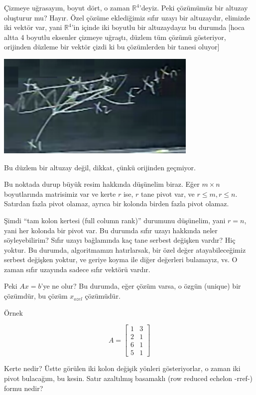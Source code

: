 \documentclass[12pt,fleqn]{article}\usepackage{../../common}
\begin{document}
Çizmeye uğrasayım, boyut dört, o zaman $\mathbb{R}^4$'deyiz. Peki çözümümüz
bir altuzay oluşturur mu? Hayır. Özel çözüme eklediğimiz sıfır uzayı bir
altuzaydır, elimizde iki vektör var, yani $\mathbb{R}^4$'in içinde iki
boyutlu bir altuzaydayız bu durumda [hoca altta 4 boyutlu eksenler çizmeye
uğraştı, düzlem tüm çözümü gösteriyor, orijinden düzleme bir vektör çizdi
ki bu çözümlerden bir tanesi oluyor]

\includegraphics[height=5cm]{8_01.png}

Bu düzlem bir altuzay değil, dikkat, çünkü orijinden geçmiyor. 

Bu noktada durup büyük resim hakkında düşünelim biraz. Eğer $m \times n$
boyutlarında matrisimiz var ve kerte $r$ ise, $r$ tane pivot var, ve 
$r \le m,r \le n$. Satırdan fazla pivot olamaz, ayrıca bir kolonda birden 
fazla pivot olamaz. 

Şimdi ``tam kolon kertesi (full column rank)'' durumunu düşünelim, yani $r = n$,
yani her kolonda bir pivot var. Bu durumda sıfır uzayı hakkında neler
söyleyebilirim? Sıfır uzayı bağlamında kaç tane serbest değişken vardır?
Hiç yoktur. Bu durumda, algoritmamızı hatırlarsak, bir özel değer
atayabileceğimiz serbest değişken yoktur, ve geriye koyma ile diğer
değerleri bulamayız, vs. O zaman sıfır uzayında sadece sıfır vektörü
vardır.

Peki $Ax=b$'ye ne olur? Bu durumda, eğer çözüm varsa, o özgün (unique) bir
çözümdür, bu çözüm $x_{ozel}$ çözümüdür.

Örnek

$$ A = 
\left[\begin{array}{rr}
1 & 3 \\
2 & 1 \\
6 & 1 \\
5 & 1 
\end{array}\right]
 $$

Kerte nedir? Üstte görülen iki kolon değişik yönleri gösteriyorlar, o
zaman iki pivot bulacağım, bu kesin. Satır azaltılmış basamaklı (row
reduced echelon -rref-) formu nedir?
\end{document}
